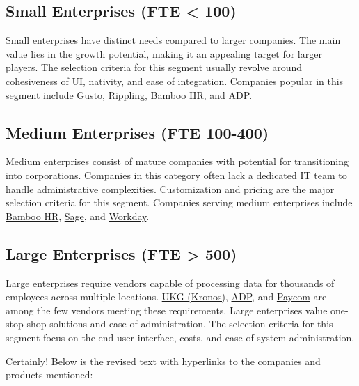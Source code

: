\documentclass[
  a4paper,
]{book}
\begin{document}
\hypertarget{small-enterprises-fte-100}{%
\subsection{Small Enterprises (FTE \textless{}
100)}\label{small-enterprises-fte-100}}

Small enterprises have distinct needs compared to larger companies. The
main value lies in the growth potential, making it an appealing target
for larger players. The selection criteria for this segment usually
revolve around cohesiveness of UI, nativity, and ease of integration.
Companies popular in this segment include
\href{https://gusto.com/}{Gusto},
\href{https://www.rippling.com/}{Rippling},
\href{https://www.bamboohr.com/}{Bamboo HR}, and
\href{https://www.adp.com/}{ADP}.

\hypertarget{medium-enterprises-fte-100-400}{%
\subsection{Medium Enterprises (FTE
100-400)}\label{medium-enterprises-fte-100-400}}

Medium enterprises consist of mature companies with potential for
transitioning into corporations. Companies in this category often lack a
dedicated IT team to handle administrative complexities. Customization
and pricing are the major selection criteria for this segment. Companies
serving medium enterprises include
\href{https://www.bamboohr.com/}{Bamboo HR},
\href{https://www.sage.com/}{Sage}, and
\href{https://www.workday.com/}{Workday}.

\hypertarget{large-enterprises-fte-500}{%
\subsection{Large Enterprises (FTE \textgreater{}
500)}\label{large-enterprises-fte-500}}

Large enterprises require vendors capable of processing data for
thousands of employees across multiple locations.
\href{https://www.ukg.com/}{UKG (Kronos)},
\href{https://www.adp.com/}{ADP}, and
\href{https://www.paycom.com/}{Paycom} are among the few vendors meeting
these requirements. Large enterprises value one-stop shop solutions and
ease of administration. The selection criteria for this segment focus on
the end-user interface, costs, and ease of system administration.

Certainly! Below is the revised text with hyperlinks to the companies
and products mentioned:
\end{document}
